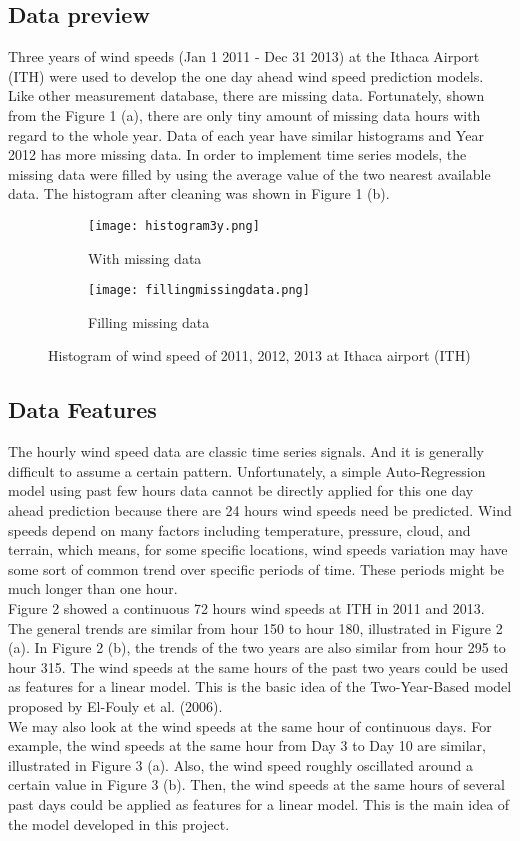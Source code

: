 \documentclass{article}
\begin{document}
\subsection*{Data preview}
Three years of wind speeds (Jan 1 2011 - Dec 31 2013) at the Ithaca Airport (ITH) were used to develop the one day ahead wind speed prediction models.  Like other measurement database, there are missing data.   Fortunately, shown from the Figure 1 (a), 
there are only tiny amount of missing data hours with regard to the whole year.  Data of each year have similar histograms and Year 2012 has more missing data.  In order to implement time series models, the missing data were filled by using the average value of the two nearest available data. 
The histogram after cleaning was shown in Figure 1 (b).\\
\begin{figure}[h]
  \begin{subfigure}[b]{0.5\textwidth}
    \texttt{[image: histogram3y.png]}
    \caption{With missing data}
    \label{fig:f1}
  \end{subfigure}
  \hfill
  \begin{subfigure}[b]{0.5\textwidth}
    \texttt{[image: fillingmissingdata.png]}
    \caption{Filling missing data}
    \label{fig:f2}
  \end{subfigure}
  \caption{Histogram of wind speed of 2011, 2012, 2013 at Ithaca airport (ITH)}
\end{figure}
\subsection*{Data Features}
The hourly wind speed data are classic time series signals.  And it is generally difficult to assume a certain pattern.  Unfortunately, a simple Auto-Regression model using past few hours data cannot be directly applied for this one day ahead prediction because there are 24 hours wind speeds need be predicted.  Wind speeds depend on many factors including temperature, pressure, cloud, and terrain, which means, for some specific locations, wind speeds variation may have some sort of common trend over specific periods of time.  These periods might be much longer than one hour.\\
Figure 2 showed a continuous 72 hours wind speeds at ITH in 2011 and 2013.  The general trends are similar from hour 150 to hour 180, illustrated in Figure 2 (a). In Figure 2 (b), the trends of the two years are also similar from hour 295 to hour 315.  The wind speeds at the same hours of the past two years could be used as features for a linear model.  This is the basic idea of the Two-Year-Based model proposed by El-Fouly et al. (2006).\\
We may also look at the wind speeds at the same hour of continuous days.  For example, the wind speeds at the same hour from Day 3 to Day 10 are similar, illustrated in Figure 3 (a).  Also, the wind speed roughly oscillated around a certain value in Figure 3 (b).  Then, the wind speeds at the same hours of several past days could be applied as features for a linear model.  This is the main idea of the model developed in this project.\\
\end{document}
